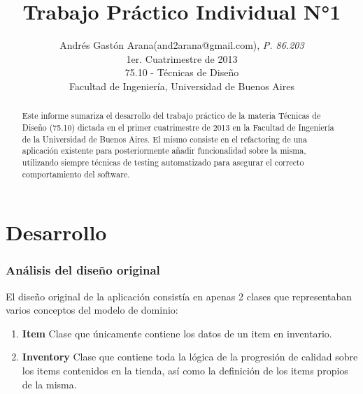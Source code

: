 \documentclass[a4paper,11pt]{article}
\title{\textbf{Trabajo Práctico Individual N°1}}
\author{
  Andrés Gastón Arana(and2arana@gmail.com), \textit{P. 86.203}     \\
  \normalsize{1er. Cuatrimestre de 2013}                           \\
  \normalsize{75.10 - Técnicas de Diseño}                          \\
  \normalsize{Facultad de Ingeniería, Universidad de Buenos Aires}
}
\date{}
\begin{document}
\thispagestyle{empty}
\maketitle

\begin{abstract}

  Este informe sumariza el desarrollo del trabajo práctico de la materia
  Técnicas de Diseño (75.10) dictada en el primer cuatrimestre de 2013 en la
  Facultad de Ingeniería de la Universidad de Buenos Aires. El mismo consiste
  en el refactoring de una aplicación existente para posteriormente añadir
  funcionalidad sobre la misma, utilizando siempre técnicas de testing
  automatizado para asegurar el correcto comportamiento del software.

\end{abstract}

\clearpage

\tableofcontents
\clearpage


\part{Desarrollo}

\section{Análisis del diseño original} \label{sec:analisis}

El diseño original de la aplicación consistía en apenas 2 clases que
representaban varios conceptos del modelo de dominio:

\begin{enumerate}

  \item \textbf{Item} Clase que únicamente contiene los datos de un item en
    inventario.

  \item \textbf{Inventory} Clase que contiene toda la lógica de la progresión
    de calidad sobre los items contenidos en la tienda, así como la definición
    de los items propios de la misma.

\end{enumerate}
\end{document}
